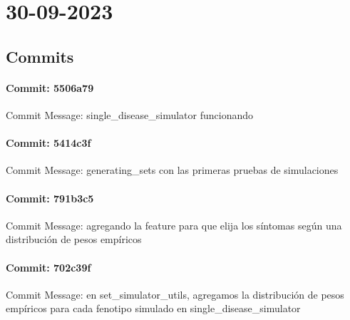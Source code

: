 \documentclass{article}
\begin{document}
\section{30-09-2023}
\subsection{Commits}
\paragraph{Commit: 5506a79}
Commit Message: single_disease_simulator funcionando

\paragraph{Commit: 5414c3f}
Commit Message: generating_sets con las primeras pruebas de simulaciones

\paragraph{Commit: 791b3c5}
Commit Message: agregando la feature para que elija los síntomas según una distribución de pesos empíricos

\paragraph{Commit: 702c39f}
Commit Message: en set_simulator_utils, agregamos la distribución de pesos empíricos para cada fenotipo simulado en single_disease_simulator

\end{document}
